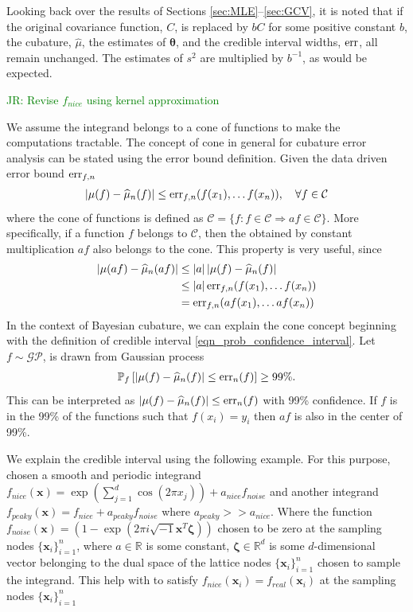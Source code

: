 \documentclass{iitthesis}          %
\newcommand{\bm}[1]{\boldsymbol{#1}}
\newcommand{\vtheta}{{\bm{\theta}}}
\newcommand{\vzeta}{{\bm{\zeta}}}
\newcommand{\vx}{\bm{x}}
\newcommand{\hmu}{\widehat{\mu}}
\newcommand{\err}{\textup{err}}
\def\abs#1{\ensuremath{\left \lvert #1 \right \rvert}}
\newcommand{\JRNote}[1]{{\textcolor{green}{JR: #1}}}
\begin{document}
Looking back over the results of Sections  \ref{sec:MLE}--\ref{sec:GCV}, it is noted that if the original covariance function, $C$, is replaced by $b C$ for some positive constant $b$, the cubature, $\hmu$, the estimates of $\vtheta$, and the credible interval widths, $\err$, all remain unchanged.  The estimates of $s^2$ are multiplied by $b^{-1}$, as would be expected. 


\JRNote{Revise $f_{nice}$ using kernel approximation}

We assume the integrand belongs to a cone of functions to make the computations tractable. The concept of cone in general for cubature error analysis can be stated using the error bound definition. Given the data driven error bound $\err_{f,n}$
\begin{align*}
\abs{\mu(f) - \hmu_n(f)} \le \err_{f,n}(f(x_1), \dots f(x_n)), \quad \forall f \in \mathcal{C}
\end{align*}  
where the cone of functions is defined as $\mathcal{C} = \{f : f \in \mathcal{C} \Rightarrow a f \in \mathcal{C} \}$. More specifically, if a function $f$ belongs to $\mathcal{C}$, then the obtained by constant multiplication $af$ also belongs to the cone. This property is very useful, since
\begin{align*}
\abs{\mu(a f) - \hmu_n(a f)} &\le \abs{a} \abs{\mu(f) - \hmu_n(f)} \\
& \le \abs{a} \err_{f,n}(f(x_1), \dots f(x_n)) \\
& = \err_{f,n}(a f(x_1), \dots a f(x_n)) \\
\end{align*}
In the context of Bayesian cubature, we can explain the cone concept beginning with the definition of credible interval \eqref{eqn_prob_confidence_interval}. 
Let $f \sim \mathcal{GP}$, is drawn from  Gaussian process
\begin{align*}
\mathbb{P}_f \left[
|\mu(f)-\hmu_n(f)| \leq \err_{n}(f) \right] \ge 99\%.
\end{align*}
This can be interpreted as $|\mu(f)-\hmu_n(f)| \leq \err_{n}(f)$ with 99\% confidence. If $f$ is in the 99\%  of the functions such that $f(x_i) = y_i$ then $af$ is also in the center of 99\%.

We explain the credible interval using the following example. For this purpose, chosen a smooth and periodic integrand $f_{nice}(\vx) = \exp(\sum_{j=1}^{d} \cos(2\pi x_j)) + a_{nice} f_{noise}$ and another integrand $f_{peaky}(\vx) = f_{nice} + a_{peaky} f_{noise}$ where $a_{peaky} >> a_{nice}$. Where the function $f_{noise}(\vx) = (1 - \exp(2\pi i \sqrt{-1} \vx^T \vzeta))$ chosen to be zero at the sampling nodes $\{ \vx_i\}_{i=1}^n$, where $a \in \mathbb{R}$ is some constant, $\vzeta \in \mathbb{R}^d$ is some $d$-dimensional vector belonging to the dual space of the lattice nodes $\{ \vx_i\}_{i=1}^n$ chosen to sample the integrand. This help with to satisfy $f_{nice}(\vx_i) = f_{real}(\vx_i) $ at the sampling nodes $\{ \vx_i\}_{i=1}^n$
\end{document}
